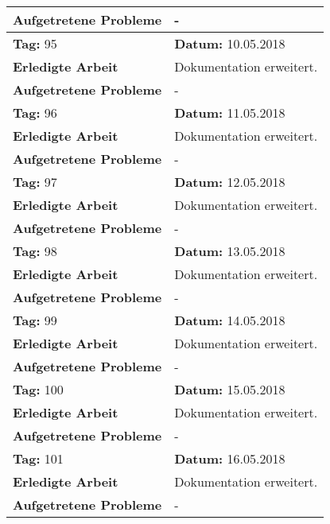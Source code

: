 \begin{longtable}{|p{5cm}|p{5cm}p{6cm}|}
\textbf{Aufgetretene Probleme} & \multicolumn{2}{p{11cm}|}{-} \\ \hline
\rowcolor{heading}\textbf{Tag:} 95 & \textbf{Datum:} 10.05.2018 & \\ \hline
\textbf{Erledigte Arbeit} & \multicolumn{2}{p{11cm}|}{Dokumentation erweitert.} \\ \hline
\textbf{Aufgetretene Probleme} & \multicolumn{2}{p{11cm}|}{-} \\ \hline
\rowcolor{heading}\textbf{Tag:} 96 & \textbf{Datum:} 11.05.2018 & \\ \hline
\textbf{Erledigte Arbeit} & \multicolumn{2}{p{11cm}|}{Dokumentation erweitert.} \\ \hline
\textbf{Aufgetretene Probleme} & \multicolumn{2}{p{11cm}|}{-} \\ \hline
\rowcolor{heading}\textbf{Tag:} 97 & \textbf{Datum:} 12.05.2018 & \\ \hline
\textbf{Erledigte Arbeit} & \multicolumn{2}{p{11cm}|}{Dokumentation erweitert.} \\ \hline
\textbf{Aufgetretene Probleme} & \multicolumn{2}{p{11cm}|}{-} \\ \hline
\rowcolor{heading}\textbf{Tag:} 98 & \textbf{Datum:} 13.05.2018 & \\ \hline
\textbf{Erledigte Arbeit} & \multicolumn{2}{p{11cm}|}{Dokumentation erweitert.} \\ \hline
\textbf{Aufgetretene Probleme} & \multicolumn{2}{p{11cm}|}{-} \\ \hline
\rowcolor{heading}\textbf{Tag:} 99 & \textbf{Datum:} 14.05.2018 & \\ \hline
\textbf{Erledigte Arbeit} & \multicolumn{2}{p{11cm}|}{Dokumentation erweitert.} \\ \hline
\textbf{Aufgetretene Probleme} & \multicolumn{2}{p{11cm}|}{-} \\ \hline
\rowcolor{heading}\textbf{Tag:} 100 & \textbf{Datum:} 15.05.2018 & \\ \hline
\textbf{Erledigte Arbeit} & \multicolumn{2}{p{11cm}|}{Dokumentation erweitert.} \\ \hline
\textbf{Aufgetretene Probleme} & \multicolumn{2}{p{11cm}|}{-} \\ \hline
\rowcolor{heading}\textbf{Tag:} 101 & \textbf{Datum:} 16.05.2018 & \\ \hline
\textbf{Erledigte Arbeit} & \multicolumn{2}{p{11cm}|}{Dokumentation erweitert.} \\ \hline
\textbf{Aufgetretene Probleme} & \multicolumn{2}{p{11cm}|}{-} \\ \hline

\end{longtable}
